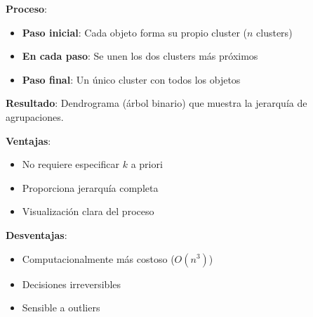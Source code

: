 \documentclass[10pt,a4paper]{article}
\begin{document}
\begin{tcolorbox}[title=Métodos Jerárquicos Aglomerativos]
    \textbf{Proceso}: 
    \begin{itemize}
        \item \textbf{Paso inicial}: Cada objeto forma su propio cluster ($n$ clusters)
        \item \textbf{En cada paso}: Se unen los dos clusters más próximos
        \item \textbf{Paso final}: Un único cluster con todos los objetos
    \end{itemize}
    
    \textbf{Resultado}: Dendrograma (árbol binario) que muestra la jerarquía de agrupaciones.
    
    \textbf{Ventajas}:
    \begin{itemize}
        \item No requiere especificar $k$ a priori
        \item Proporciona jerarquía completa
        \item Visualización clara del proceso
    \end{itemize}
    
    \textbf{Desventajas}:
    \begin{itemize}
        \item Computacionalmente más costoso ($O(n^3)$)
        \item Decisiones irreversibles
        \item Sensible a outliers
    \end{itemize}
\end{tcolorbox}
\end{document}
